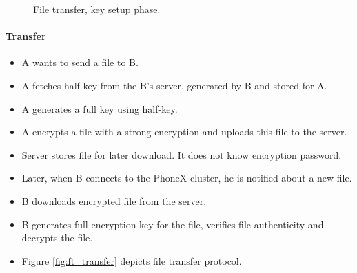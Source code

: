 \documentclass[a4paper,10pt]{article}
\begin{document}
\begin{center}
\begin{figure}[h!]
\centering
{}
\caption{File transfer, key setup phase.}
\label{fig:ft_setup}
\end{figure}
\end{center}


\paragraph{Transfer}
\begin{itemize}
 \item A wants to send a file to B.
 \item A fetches half-key from the B's server, generated by B and stored for A.
 \item A generates a full key using half-key.
 \item A encrypts a file with a strong encryption and uploads this file to the server.
 \item Server stores file for later download. It does not know encryption password.
 \item Later, when B connects to the PhoneX cluster, he is notified about a new file.
 \item B downloads encrypted file from the server.
 \item B generates full encryption key for the file, verifies file authenticity and decrypts the file.
 \item Figure \ref{fig:ft_transfer} depicts file transfer protocol. 
\end{itemize}
\end{document}
